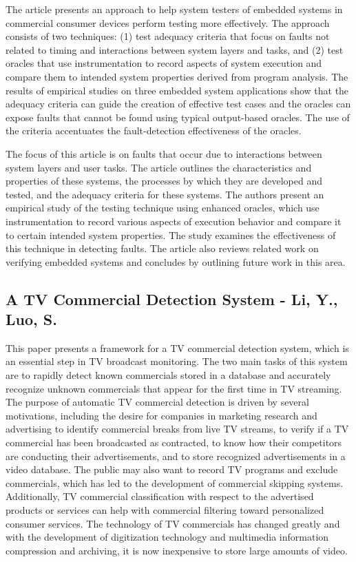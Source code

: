 \documentclass[12pt, twoside]{article}
\begin{document}
The article presents an approach to help system testers of embedded systems in commercial consumer devices perform testing more effectively. The approach consists of two techniques: (1) test adequacy criteria that focus on faults not related to timing and interactions between system layers and tasks, and (2) test oracles that use instrumentation to record aspects of system execution and compare them to intended system properties derived from program analysis. The results of empirical studies on three embedded system applications show that the adequacy criteria can guide the creation of effective test cases and the oracles can expose faults that cannot be found using typical output-based oracles. The use of the criteria accentuates the fault-detection effectiveness of the oracles.

The focus of this article is on faults that occur due to interactions between system layers and user tasks. The article outlines the characteristics and properties of these systems, the processes by which they are developed and tested, and the adequacy criteria for these systems. The authors present an empirical study of the testing technique using enhanced oracles, which use instrumentation to record various aspects of execution behavior and compare it to certain intended system properties. The study examines the effectiveness of this technique in detecting faults. The article also reviews related work on verifying embedded systems and concludes by outlining future work in this area.


\subsection{A TV Commercial Detection System - Li, Y., Luo, S.}
This paper presents a framework for a TV commercial detection system, which is an essential step in TV broadcast monitoring. The two main tasks of this system are to rapidly detect known commercials stored in a database and accurately recognize unknown commercials that appear for the first time in TV streaming. The purpose of automatic TV commercial detection is driven by several motivations, including the desire for companies in marketing research and advertising to identify commercial breaks from live TV streams, to verify if a TV commercial has been broadcasted as contracted, to know how their competitors are conducting their advertisements, and to store recognized advertisements in a video database. The public may also want to record TV programs and exclude commercials, which has led to the development of commercial skipping systems. Additionally, TV commercial classification with respect to the advertised products or services can help with commercial filtering toward personalized consumer services. The technology of TV commercials has changed greatly and with the development of digitization technology and multimedia information compression and archiving, it is now inexpensive to store large amounts of video.
\end{document}
